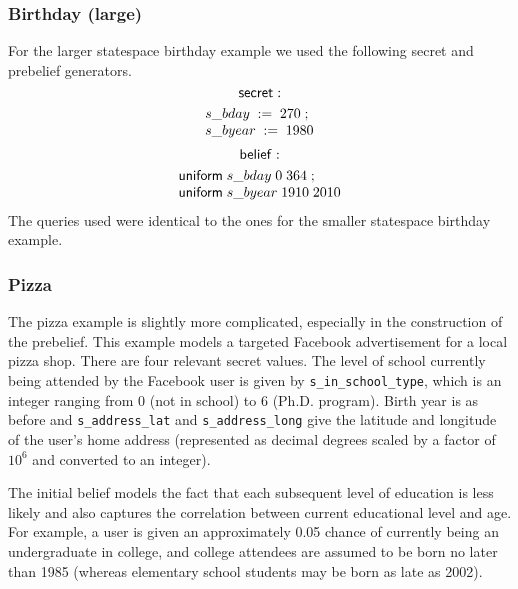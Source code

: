\subsubsection{Birthday (large)}

For the larger statespace birthday example we used the following
secret and prebelief generators.
$$ \mathsf{secret}: $$
\begin{displaymath}{\small
\begin{array}{l}
  \sassign{s\text{\_}bday}{270}\; ;\\
  \sassign{s\text{\_}byear}{1980}\\
\end{array}
}\end{displaymath}
$$ \mathsf{belief}: $$
\begin{displaymath}{\small
\begin{array}{l}
  \suniform{s\text{\_}bday}{0}{364}\; ;\\
  \suniform{s\text{\_}byear}{1910}{2010}\\
\end{array}
}\end{displaymath}
The queries used were identical to the ones for the smaller statespace
birthday example.

\subsubsection{Pizza}

The pizza example is slightly more complicated, especially in the
construction of the prebelief.  This example models a targeted
Facebook advertisement for a local pizza shop.  There are four
relevant secret values.  The level of school currently being attended
by the Facebook user
is given by \verb|s_in_school_type|, which is an integer
ranging from 0 (not in school) to 6 (Ph.D. program).  Birth year
is as before and \verb|s_address_lat| and \verb|s_address_long|
give the latitude and longitude of the user's home address (represented as
decimal degrees scaled by a factor of
$10^6$ and converted to an integer).

The initial belief models the fact that each subsequent level of
education is less likely and also captures the correlation between current
educational level and age.  For example, a user is given an approximately 0.05 chance of
currently being an undergraduate in college, and college attendees are assumed to be born
no later than 1985 (whereas elementary school students may be born as
late as 2002).

